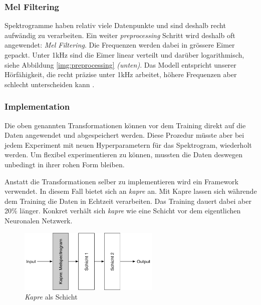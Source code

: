 \subsubsection{Mel Filtering} 

Spektrogramme haben relativ viele Datenpunkte und sind deshalb recht aufwändig zu verarbeiten. Ein weiter \textit{preprocessing} Schritt wird deshalb oft angewendet: \textit{Mel Filtering}\parencite{mel}. Die Frequenzen werden dabei in grössere Eimer gepackt. Unter 1kHz sind die Eimer linear verteilt und darüber logarithmisch, siehe Abbildung \ref{img:preprocessing} \textit{(unten)}. Das Modell entspricht unserer Hörfähigkeit, die recht präzise unter 1kHz arbeitet, höhere Frequenzen aber schlecht unterscheiden kann \parencite{tenkHz}. 

\subsubsection{Implementation}

Die oben genannten Transformationen können vor dem Training direkt auf die Daten angewendet und abgespeichert werden. Diese Prozedur müsste aber bei jedem Experiment mit neuen Hyperparametern für das Spektrogram, wiederholt werden. Um flexibel experimentieren zu können, mussten die Daten deswegen unbedingt in ihrer rohen Form bleiben. 

Anstatt die Transformationen selber zu implementieren wird ein Framework verwendet. In diesem Fall bietet sich an \textit{kapre}\parencite{kapre} an. Mit Kapre lassen sich währende dem Training die Daten in Echtzeit verarbeiten. Das Training dauert dabei aber 20\% länger. Konkret verhält sich \textit{kapre} wie eine Schicht vor dem eigentlichen Neuronalen Netzwerk.
\begin{figure}[hbt]
	\centering
		\includegraphics[width=0.6\textwidth]{assets/kapre.png}
	\centering
	\caption{\textit{Kapre}\parencite{kapre} als Schicht}
	\label{img:kapre}
\end{figure}

